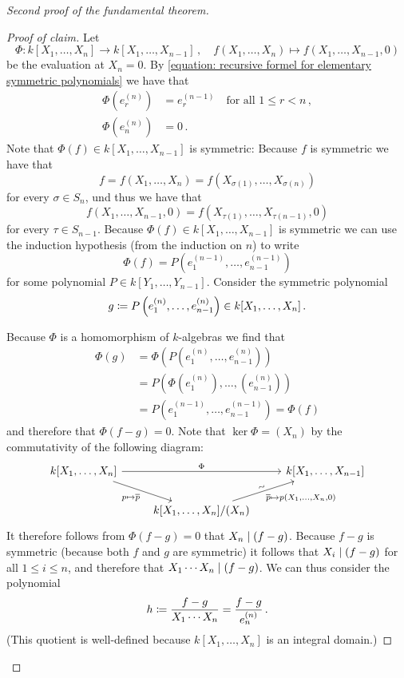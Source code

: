 \begin{proof}[Second proof of the fundamental theorem]
\begin{proof}[Proof of claim]
    Let
    \[
              \Phi
      \colon  k[X_1, \dotsc, X_n]
      \to     k[X_1, \dotsc, X_{n-1}] \,,
      \quad   f(X_1, \dotsc, X_n)
      \mapsto f(X_1, \dotsc, X_{n-1}, 0)
    \]
    be the evaluation at $X_n = 0$.
    By \eqref{equation: recursive formel for elementary symmetric polynomials} we have that
    \begin{align*}
          \Phi\left( e^{(n)}_r \right)
      &=  e^{(n-1)}_r
      \quad \text{for all $1 \leq r < n$} \,,
      \\
          \Phi\left( e^{(n)}_n \right)
      &=  0 \,.
    \end{align*}
    Note that $\Phi(f) \in k[X_1, \dotsc, X_{n-1}]$ is symmetric:
    Because $f$ is symmetric we have that
    \[
        f
      = f(X_1, \dotsc, X_n)
      = f(X_{\sigma(1)}, \dotsc, X_{\sigma(n)})
    \]
    for every $\sigma \in S_n$, und thus we have that
    \[
        f(X_1, \dotsc, X_{n-1}, 0)
      = f(X_{\tau(1)}, \dotsc, X_{\tau(n-1)}, 0)
    \]
    for every $\tau \in S_{n-1}$.
    Because $\Phi(f) \in k[X_1, \dotsc, X_{n-1}]$ is symmetric we can use the induction hypothesis (from the induction on $n$) to write
    \[
        \Phi(f)
      = P\left( e^{(n-1)}_1, \dotsc, e^{(n-1)}_{n-1} \right)
    \]
    for some polynomial $P \in k[Y_1, \dotsc, Y_{n-1}]$.
    Consider the symmetric polynomial
    \[
                g
      \coloneqq  P\left( e^{(n)}_1, \dotsc, e^{(n)}_{n-1} \right)
      \in       k[X_1, \dotsc, X_n] \,.
    \]
    
    Because $\Phi$ is a homomorphism of $k$-algebras we find that
    \begin{align*}
         \Phi(g)
      &= \Phi\left( P\left(e^{(n)}_1, \dotsc, e^{(n)}_{n-1}\right) \right) \\
      &= P\left( \Phi\left(e^{(n)}_1\right), \dotsc, \left(e^{(n)}_{n-1}\right) \right) \\
      &= P\left( e^{(n-1)}_1, \dotsc, e^{(n-1)}_{n-1} \right)
       = \Phi(f)
    \end{align*}
    and therefore that $\Phi(f - g) = 0$.
    Note that $\ker \Phi = (X_n)$ by the commutativity of the following diagram:
    \[
      \begin{tikzcd}
          k[X_1, \dotsc, X_n]
          \arrow{rr}[above]{\Phi}
          \arrow{rd}[below left]{p \mapsto \class{p}}
        & {}
        & k[X_1, \dotsc, X_{n-1}]
        \\
          {}
        & k[X_1, \dotsc, X_n]/(X_n)
          \arrow{ru}[above,rotate=20]{\sim}[below right]{\class{p} \mapsto p(X_1, \dotsc, X_n, 0)}
        & {}
      \end{tikzcd}
    \]
    It therefore follows from $\Phi(f - g) = 0$ that $X_n \mid (f-g)$.
    Because $f-g$ is symmetric (because both $f$ and $g$ are symmetric) it follows that $X_i \mid (f-g)$ for all $1 \leq i \leq n$, and therefore that $X_1 \dotsm X_n \mid (f-g)$.
    We can thus consider the polynomial
    \[
                h
      \coloneqq  \frac{f-g}{X_1 \dotsm X_n}
      =         \frac{f-g}{e^{(n)}_n} \,.
    \]
    (This quotient is well-defined because $k[X_1, \dotsc, X_n]$ is an integral domain.)
    

\end{proof}
\end{proof}
